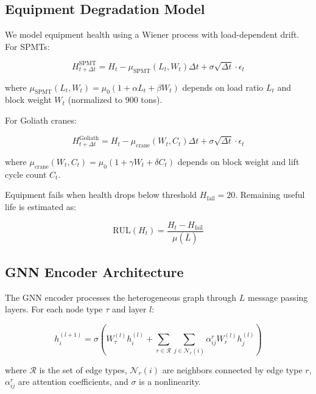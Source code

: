 \documentclass[11pt,a4paper]{article}
\begin{document}
\subsection{Equipment Degradation Model}

We model equipment health using a Wiener process with load-dependent drift. For SPMTs:

\begin{equation}
H_{t+\Delta t}^{\text{SPMT}} = H_t - \mu_{\text{SPMT}}(L_t, W_t) \Delta t + \sigma \sqrt{\Delta t} \cdot \epsilon_t
\end{equation}

where $\mu_{\text{SPMT}}(L_t, W_t) = \mu_0 (1 + \alpha L_t + \beta W_t)$ depends on load ratio $L_t$ and block weight $W_t$ (normalized to 900 tons).

For Goliath cranes:

\begin{equation}
H_{t+\Delta t}^{\text{Goliath}} = H_t - \mu_{\text{crane}}(W_t, C_t) \Delta t + \sigma \sqrt{\Delta t} \cdot \epsilon_t
\end{equation}

where $\mu_{\text{crane}}(W_t, C_t) = \mu_0 (1 + \gamma W_t + \delta C_t)$ depends on block weight and lift cycle count $C_t$.

Equipment fails when health drops below threshold $H_{\text{fail}} = 20$. Remaining useful life is estimated as:

\begin{equation}
\text{RUL}(H_t) = \frac{H_t - H_{\text{fail}}}{\mu(\bar{L})}
\end{equation}

\subsection{GNN Encoder Architecture}

The GNN encoder processes the heterogeneous graph through $L$ message passing layers. For each node type $\tau$ and layer $l$:

\begin{equation}
h_i^{(l+1)} = \sigma \left( W_\tau^{(l)} h_i^{(l)} + \sum_{r \in \mathcal{R}} \sum_{j \in \mathcal{N}_r(i)} \alpha_{ij}^r W_r^{(l)} h_j^{(l)} \right)
\end{equation}

where $\mathcal{R}$ is the set of edge types, $\mathcal{N}_r(i)$ are neighbors connected by edge type $r$, $\alpha_{ij}^r$ are attention coefficients, and $\sigma$ is a nonlinearity.
\end{document}
